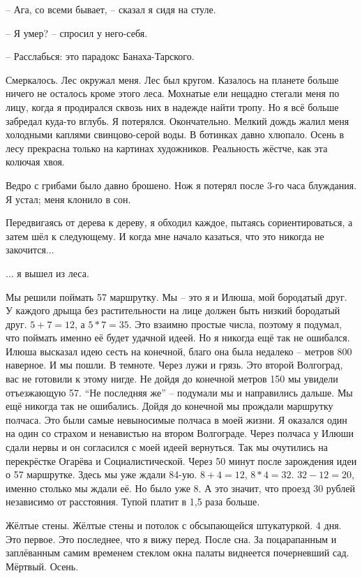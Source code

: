 -- Ага, со всеми бывает, -- сказал я сидя на стуле.

-- Я умер? -- спросил у него-себя.

-- Расслабься: это парадокс Банаха-Тарского.

\asterisks

Смеркалось. Лес окружал меня. Лес был кругом. Казалось на планете больше ничего не осталось кроме этого леса. Мохнатые ели нещадно стегали меня по лицу, когда я продирался сквозь них в надежде найти тропу. Но я всё больше забредал куда-то вглубь. Я потерялся. Окончательно. Мелкий дождь жалил меня холодными каплями свинцово-серой воды. В ботинках давно хлюпало. Осень в лесу прекрасна только на картинах художников. Реальность жёстче, как эта колючая хвоя.

Ведро с грибами было давно брошено. Нож я потерял после 3-го часа блуждания. Я устал; меня клонило в сон.

Передвигаясь от дерева к дереву, я обходил каждое, пытаясь сориентироваться, а затем шёл к следующему. И когда мне начало казаться, что это никогда не закочится...

... я вышел из леса.

\asterisks

Мы решили поймать 57 маршрутку. Мы -- это я и Илюша, мой бородатый друг. У каждого дрыща без растительности на лице должен быть низкий бородатый друг. \( 5+7=12 \), а \( 5*7=35 \). Это взаимно простые числа, поэтому я подумал, что поймать именно её будет удачной идеей. Но я никогда ещё так не ошибался. Илюша высказал идею сесть на конечной, благо она была недалеко -- метров 800 наверное. И мы пошли. В темноте. Через лужи и грязь. Это второй Волгоград, вас не готовили к этому нигде. Не дойдя до конечной метров 150 мы увидели отъезжающую 57. ``Не последняя же'' -- подумали мы и направились дальше. Мы ещё никогда так не ошибались. Дойдя до конечной мы прождали маршрутку полчаса. Это были самые невыносимые полчаса в моей жизни. Я оказался один на один со страхом и ненавистью на втором Волгограде. Через полчаса у Илюши сдали нервы и он согласился с моей идеей вернуться. Так мы очутились на перекрёстке Огарёва и Социалистической. Через 50 минут после зарождения идеи о 57 маршрутке. Здесь мы уже ждали 84-ую. \( 8 + 4 = 12 \), \( 8 * 4 = 32 \). \( 32 - 12 = 20 \), именно столько мы ждали её. Но было уже 8. А это значит, что проезд 30 рублей независимо от расстояния. Тупой платит в 1,5 раза больше.

\asterisks

Жёлтые стены. Жёлтые стены и потолок с обсыпающейся штукатуркой. 4 дня. Это первое. Это последнее, что я вижу перед. После сна. За поцарапанным и заплёванным самим временем стеклом окна палаты виднеется почерневший сад. Мёртвый. Осень.

